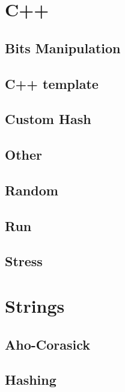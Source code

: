 \section{C++}
\subsection{Bits Manipulation}
\raggedbottom
\hrulefill
\subsection{C++ template}
\raggedbottom
\hrulefill
\subsection{Custom Hash}
\raggedbottom
\hrulefill
\subsection{Other}
\raggedbottom
\hrulefill
\subsection{Random}
\raggedbottom
\hrulefill
\subsection{Run}
\raggedbottom
\hrulefill
\subsection{Stress}
\raggedbottom
\hrulefill

\section{Strings}
\subsection{Aho-Corasick}
\raggedbottom
\hrulefill
\subsection{Hashing}
\raggedbottom
\hrulefill
